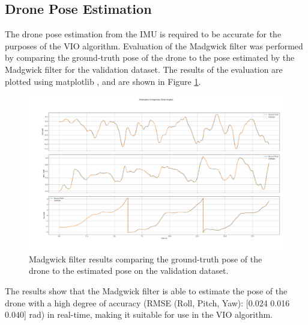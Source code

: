 \documentclass[bare_jrnl_transmag]{subfiles}
\begin{document}
\subsection{Drone Pose Estimation}
The drone pose estimation from the IMU is required to be accurate for the purposes of the VIO algorithm. Evaluation of the Madgwick filter was performed by comparing the ground-truth pose of the drone to the pose estimated by the Madgwick filter for the validation dataset. The results of the evaluation are plotted using matplotlib \cite{matplotlib}, and are shown in Figure \ref{fig:madgwick_results}.

\begin{figure}[H]
    \centering
    \includegraphics[width=0.8\linewidth]{figures/madgwick_results.png}
    \caption{Madgwick filter results comparing the ground-truth pose of the drone to the estimated pose on the validation dataset.}
    \label{fig:madgwick_results}
\end{figure}

The results show that the Madgwick filter is able to estimate the pose of the drone with a high degree of accuracy (RMSE (Roll, Pitch, Yaw): [0.024 0.016 0.040] rad) in real-time, making it suitable for use in the VIO algorithm.
\end{document}
